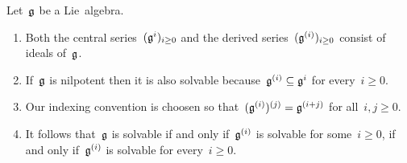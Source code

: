 \begin{remark}
  Let~$\mathfrak{g}$ be a Lie~algebra.
  \begin{enumerate}
    \item
      Both the central series~$(\mathfrak{g}^i)_{i \geq 0}$ and the derived series~$(\mathfrak{g}^{(i)})_{i \geq 0}$ consist of ideals of~$\mathfrak{g}$.
    \item
      If~$\mathfrak{g}$ is nilpotent then it is also solvable because~$\mathfrak{g}^{(i)} \subseteq \mathfrak{g}^i$ for every~$i \geq 0$.
    \item
      Our indexing convention is choosen so that~$(\mathfrak{g}^{(i)})^{(j)} = \mathfrak{g}^{(i+j)}$ for all~$i, j \geq 0$.
    \item
      It follows that~$\mathfrak{g}$ is solvable if and only if~$\mathfrak{g}^{(i)}$ is solvable for some~$i \geq 0$, if and only if~$\mathfrak{g}^{(i)}$ is solvable for every~$i \geq 0$.
  \end{enumerate}
\end{remark}


